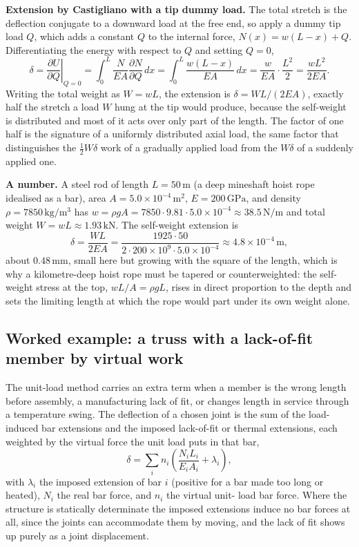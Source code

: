 \textbf{Extension by Castigliano with a tip dummy load.} The total stretch
is the deflection conjugate to a downward load at the free end, so apply a
dummy tip load $Q$, which adds a constant $Q$ to the internal force,
$N(x) = w(L-x) + Q$. Differentiating the energy with respect to $Q$ and
setting $Q=0$,
\[
\delta = \left.\frac{\partial U}{\partial Q}\right|_{Q=0}
= \int_0^L \frac{N}{EA}\frac{\partial N}{\partial Q}\,dx
= \int_0^L \frac{w(L-x)}{EA}\,dx
= \frac{w}{EA}\cdot\frac{L^2}{2}
= \frac{w L^2}{2EA}.
\]
Writing the total weight as $W = wL$, the extension is $\delta = WL/(2EA)$,
exactly half the stretch a load $W$ hung at the tip would produce, because
the self-weight is distributed and most of it acts over only part of the
length. The factor of one half is the signature of a uniformly distributed
axial load, the same factor that distinguishes the $\tfrac12 W\delta$ work
of a gradually applied load from the $W\delta$ of a suddenly applied one.

\textbf{A number.} A steel rod of length $L = 50\,\si{\meter}$ (a deep
mineshaft hoist rope idealised as a bar), area $A = 5.0\times 10^{-4}\,\si
{\meter\squared}$, $E = 200\,\si{\giga\pascal}$, and density $\rho = 7850\,
\si{\kilogram\per\meter\cubed}$ has $w = \rho g A = 7850\cdot 9.81\cdot
5.0\times 10^{-4} \approx 38.5\,\si{\newton\per\meter}$ and total weight
$W = wL \approx 1.93\,\si{\kilo\newton}$. The self-weight extension is
\[
\delta = \frac{W L}{2EA}
= \frac{1925\cdot 50}{2\cdot 200\times 10^{9}\cdot 5.0\times 10^{-4}}
\approx 4.8\times 10^{-4}\,\si{\meter},
\]
about $0.48\,\si{\milli\meter}$, small here but growing with the square of
the length, which is why a kilometre-deep hoist rope must be tapered or
counterweighted: the self-weight stress at the top, $wL/A = \rho g L$, rises
in direct proportion to the depth and sets the limiting length at which the
rope would part under its own weight alone.

\subsection{Worked example: a truss with a lack-of-fit member by virtual
work}

The unit-load method carries an extra term when a member is the wrong
length before assembly, a manufacturing lack of fit, or changes length in
service through a temperature swing. The deflection of a chosen joint is the
sum of the load-induced bar extensions and the imposed lack-of-fit or
thermal extensions, each weighted by the virtual force the unit load puts in
that bar,
\[
\delta = \sum_i n_i\left(\frac{N_i L_i}{E_i A_i} + \lambda_i\right),
\]
with $\lambda_i$ the imposed extension of bar $i$ (positive for a bar made
too long or heated), $N_i$ the real bar force, and $n_i$ the virtual unit-
load bar force. Where the structure is statically determinate the imposed
extensions induce no bar forces at all, since the joints can accommodate
them by moving, and the lack of fit shows up purely as a joint
displacement.

